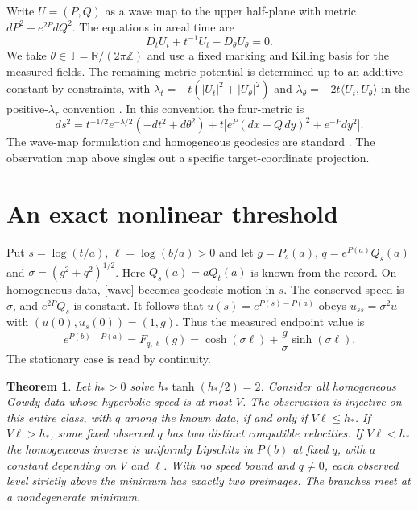 \documentclass[11pt]{article}
\newtheorem{theorem}{Theorem}
\newcommand{\TT}{\mathbb{T}}
\begin{document}
Write $U=(P,Q)$ as a wave map to the upper half-plane with metric
$dP^2+e^{2P}dQ^2$. The equations in areal time are
\begin{equation}
 D_t U_t+t^{-1}U_t-D_\theta U_\theta=0.
 \label{wave}
\end{equation}
We take $\theta\in\TT=\mathbb R/(2\pi\mathbb Z)$ and use a fixed
marking and Killing basis for the measured fields.
The remaining metric potential is determined up to an additive
constant by constraints, with
$\lambda_t=-t(|U_t|^2+|U_\theta|^2)$ and
$\lambda_\theta=-2t\langle U_t,U_\theta\rangle$ in the
positive-$\lambda_\tau$ convention \cite{amorim}.
In this convention the four-metric is
\[
 ds^2=t^{-1/2}e^{-\lambda/2}(-dt^2+d\theta^2)
       +t\big[e^P(dx+Q\,dy)^2+e^{-P}dy^2\big].
\]
The wave-map formulation and homogeneous geodesics are standard
\cite{ringstrom,lim}. The observation map above singles out a
specific target-coordinate projection.

\section{An exact nonlinear threshold}
Put $s=\log(t/a)$, $\ell=\log(b/a)>0$ and let
$g=P_s(a)$, $q=e^{P(a)}Q_s(a)$ and
$\sigma=(g^2+q^2)^{1/2}$.
Here $Q_s(a)=a Q_t(a)$ is known from the record.
On homogeneous data, \eqref{wave} becomes geodesic motion in $s$.
The conserved speed is $\sigma$, and $e^{2P}Q_s$ is constant.
It follows that $u(s)=e^{P(s)-P(a)}$ obeys
$u_{ss}=\sigma^2u$ with $(u(0),u_s(0))=(1,g)$. Thus the measured
endpoint value is
\begin{equation}
 e^{P(b)-P(a)}
 = F_{q,\ell}(g)
 =\cosh(\sigma\ell)+\frac{g}{\sigma}\sinh(\sigma\ell).
 \label{hom}
\end{equation}
The stationary case is read by continuity.

\begin{theorem}
\label{th:threshold}
Let $h_*>0$ solve $h_*\tanh(h_*/2)=2$.
Consider all homogeneous Gowdy data whose hyperbolic speed is at most $V$.
The observation is injective on this entire class, with $q$ among
the known data, if and only if $V\ell\le h_*$.
If $V\ell>h_*$, some fixed observed $q$ has two distinct compatible
velocities. If $V\ell<h_*$ the homogeneous inverse
is uniformly Lipschitz in $P(b)$ at fixed $q$, with a constant
depending on $V$ and $\ell$.
With no speed bound and $q\ne0$, each observed level strictly above
the minimum has exactly two preimages. The branches meet at a
nondegenerate minimum.
\end{theorem}
\end{document}
